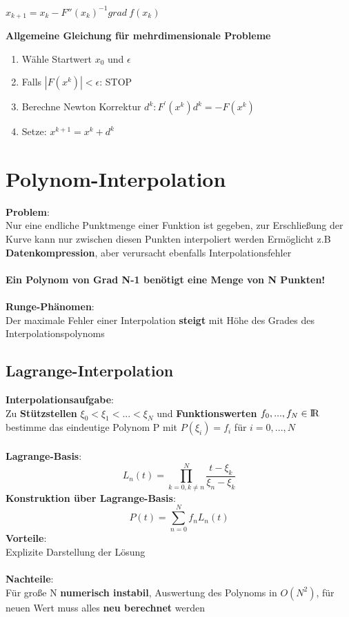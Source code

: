 \documentclass[10pt,a4paper]{article}
\def\realnumbers{{\rm I\!R}}
\begin{document}
	\begin{center}
		$x_{k + 1} = x_k - F''(x_k)^{-1} grad\ f(x_k)$
        \end{center}
        \textbf{Allgemeine Gleichung für mehrdimensionale Probleme}
        \begin{enumerate}
        	\item Wähle Startwert $x_0$ und $\epsilon$
        	\item Falls $|F(x^k)| < \epsilon$: STOP
        	\item Berechne Newton Korrektur $d^k: F^{\prime}(x^k)d^k = -F(x^k)$
        	\item Setze: $x^{k+1} = x^{k} + d^{k}$
        \end{enumerate}

    \newpage
    \section{Polynom-Interpolation}

	\textbf{Problem}:\\Nur eine endliche Punktmenge einer Funktion ist gegeben, zur Erschließung der Kurve kann nur zwischen diesen Punkten interpoliert werden
	Ermöglicht z.B \textbf{Datenkompression}, aber verursacht ebenfalls Interpolationsfehler\\\\
	\textbf{Ein Polynom von Grad N-1 benötigt eine Menge von N Punkten!}\\\\
	\textbf{Runge-Phänomen}:\\Der maximale Fehler einer Interpolation \textbf{steigt} mit Höhe des Grades des Interpolationspolynoms

	\subsection{Lagrange-Interpolation}
	\textbf{Interpolationsaufgabe}:\\Zu \textbf{Stützstellen} $\xi_0 < \xi_1 < ... < \xi_N$ und \textbf{Funktionswerten} $f_0, ..., f_N \in \realnumbers$ bestimme das eindeutige Polynom P mit $P(\xi_i) = f_i$ für $i = 0, ..., N$\\\\
	\textbf{Lagrange-Basis}: $$L_n(t) = \prod^{N}_{k = 0, k \neq n} \frac{t - \xi_k}{\xi_n - \xi_k}$$
	\textbf{Konstruktion über Lagrange-Basis}: $$P(t) = \sum^N_{n = 0}f_nL_n(t)$$
	\textbf{Vorteile}:\\Explizite Darstellung der Lösung\\\\
	\textbf{Nachteile}:\\Für große N \textbf{numerisch instabil}, Auswertung des Polynoms in $O(N^2)$, für neuen Wert muss alles \textbf{neu berechnet} werden
	
\end{document}
